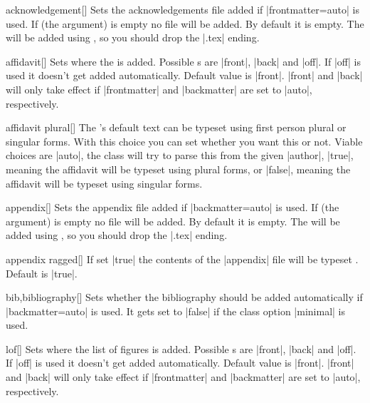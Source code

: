 \begin{describeopt}{acknowledgement}[]
  Sets the acknowledgements file added if \bverb|frontmatter=auto| is used. If
   (the argument) is empty no file will be added. By default it is
  empty. The  will be added using , so you should drop
  the \bverb|.tex| ending.
\end{describeopt}
\begin{describeopt}{affidavit}[]
  Sets where the  is added. Possible s are |front|,
  |back| and |off|. If |off| is used it doesn't get added automatically. Default
  value is |front|. |front| and |back| will only take effect if |frontmatter|
  and |backmatter| are set to |auto|, respectively.
\end{describeopt}
\begin{describeopt}{affidavit plural}[]
  The 's default text can be typeset using first person plural or
  singular forms. With this choice you can set whether you want this or not.
  Viable choices are |auto|, the class will try to parse this from the given
  |author|, |true|, meaning the affidavit will be typeset using plural forms, or
  |false|, meaning the affidavit will be typeset using singular forms.
\end{describeopt}
\begin{describeopt}{appendix}[]
  Sets the appendix file added if \bverb|backmatter=auto| is used. If
   (the argument) is empty no file will be added. By default it is
  empty. The  will be added using , so you should drop
  the \bverb|.tex| ending.
\end{describeopt}
\begin{describeopt}{appendix ragged}[]
  If set |true| the contents of the |appendix| file will be typeset
  . Default is |true|.
\end{describeopt}
\begin{describeopt}{bib,bibliography}[]
  Sets whether the bibliography should be added automatically if
  \bverb|backmatter=auto| is used. It gets set to |false| if the
  class option |minimal| is used. 
\end{describeopt}
\begin{describeopt}{lof}[]
  Sets where the list of figures is added. Possible s are |front|,
  |back| and |off|. If |off| is used it doesn't get added automatically. Default
  value is |front|. |front| and |back| will only take effect if |frontmatter|
  and |backmatter| are set to |auto|, respectively.
\end{describeopt}
